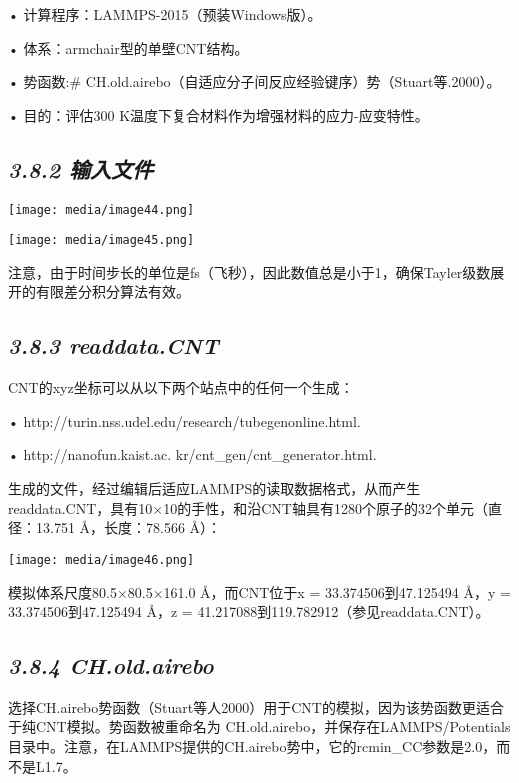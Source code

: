 \documentclass[
]{article}
\begin{document}
• 计算程序：LAMMPS-2015（预装Windows版）。

• 体系：armchair型的单壁CNT结构。

• 势函数:\#
CH.old.airebo（自适应分子间反应经验键序）势（Stuart等.2000）。

• 目的：评估300 K温度下复合材料作为增强材料的应力-应变特性。

\hypertarget{ux8f93ux5165ux6587ux4ef6-6}{%
\subsection{\texorpdfstring{\emph{3.8.2
输入文件}}{3.8.2 输入文件}}\label{ux8f93ux5165ux6587ux4ef6-6}}

\texttt{[image: media/image44.png]}

\texttt{[image: media/image45.png]}

注意，由于时间步长的单位是fs（飞秒），因此数值总是小于1，确保Tayler级数展开的有限差分积分算法有效。

\hypertarget{readdata.cnt}{%
\subsection{\texorpdfstring{\emph{3.8.3
readdata.CNT}}{3.8.3 readdata.CNT}}\label{readdata.cnt}}

CNT的xyz坐标可以从以下两个站点中的任何一个生成：

• http://turin.nss.udel.edu/research/tubegenonline.html.

• http://nanofun.kaist.ac. kr/cnt\_gen/cnt\_generator.html.

生成的文件，经过编辑后适应LAMMPS的读取数据格式，从而产生readdata.CNT，具有10×10的手性，和沿CNT轴具有1280个原子的32个单元（直径：13.751
Å，长度：78.566 Å）：

\texttt{[image: media/image46.png]}

模拟体系尺度80.5×80.5×161.0 Å，而CNT位于x = 33.374506到47.125494 Å，y =
33.374506到47.125494 Å，z = 41.217088到119.782912（参见readdata.CNT）。

\hypertarget{ch.old.airebo}{%
\subsection{\texorpdfstring{\emph{3.8.4
CH.old.airebo}}{3.8.4 CH.old.airebo}}\label{ch.old.airebo}}

选择CH.airebo势函数（Stuart等人2000）用于CNT的模拟，因为该势函数更适合于纯CNT模拟。势函数被重命名为
CH.old.airebo，并保存在LAMMPS/Potentials目录中。注意，在LAMMPS提供的CH.airebo势中，它的rcmin\_CC参数是2.0，而不是L1.7。
\end{document}
